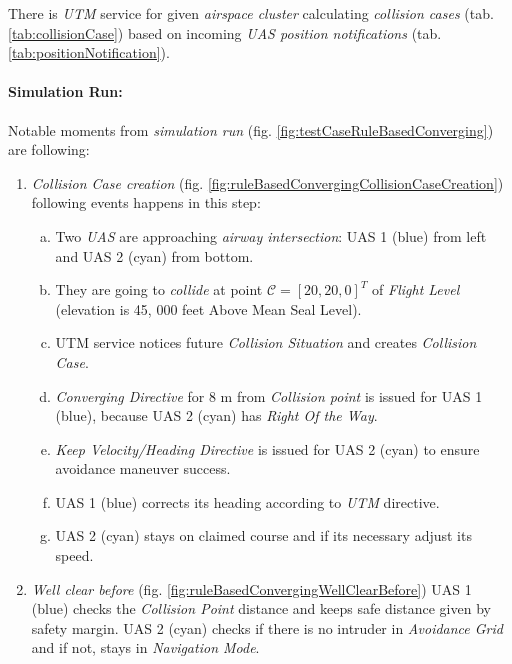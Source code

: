 There is \emph{UTM} service for given \emph{airspace cluster} calculating \emph{collision cases} (tab. \ref{tab:collisionCase}) based on incoming \emph{UAS position notifications} (tab. \ref{tab:positionNotification}).

\paragraph{Simulation Run:} Notable moments from \emph{simulation run} (fig. \ref{fig:testCaseRuleBasedConverging}) are following:

\begin{enumerate}
    \item \emph{Collision Case creation} (fig. \ref{fig:ruleBasedConvergingCollisionCaseCreation}) following events happens in this step:
    \begin{enumerate}[a.]
        \item Two \emph{UAS} are approaching  \emph{airway intersection}: UAS 1 (blue) from left and UAS 2 (cyan) from bottom.
        
        \item They are going to \emph{collide} at point $\mathscr{C}=[20,20,0]^T$ of \emph{Flight Level} (elevation is 45, 000 feet Above Mean Seal Level).
        
        \item UTM service notices future \emph{Collision Situation} and creates \emph{Collision Case}.
        
        \item \emph{Converging Directive} for 8 m from \emph{Collision point} is issued for UAS 1 (blue), because UAS 2 (cyan) has \emph{Right Of the Way}.
        
        \item \emph{Keep Velocity/Heading Directive} is issued for UAS 2 (cyan) to ensure avoidance maneuver success.
        
        \item UAS 1 (blue) corrects its heading according to \emph{UTM} directive.
        
        \item UAS 2 (cyan) stays on claimed course and if its necessary adjust its speed.
        
    \end{enumerate}
    
    \item \emph{Well clear before} (fig. \ref{fig:ruleBasedConvergingWellClearBefore}) UAS 1 (blue) checks the \emph{Collision Point} distance and keeps safe distance given by safety margin. UAS 2 (cyan) checks if there is no intruder in \emph{Avoidance Grid} and if not, stays in \emph{Navigation Mode}.
    

\end{enumerate}
